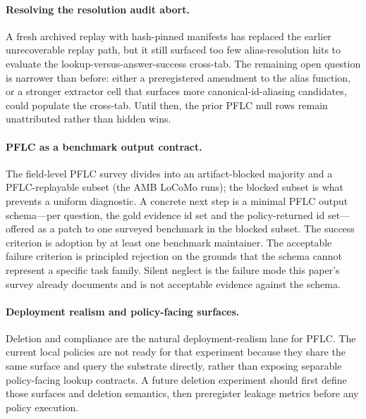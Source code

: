 \paragraph{Resolving the resolution audit abort.}
A fresh archived replay with hash-pinned manifests has replaced the earlier
unrecoverable replay path, but it still surfaced too few alias-resolution hits
to evaluate the lookup-versus-answer-success cross-tab. The remaining open
question is narrower than before: either a preregistered amendment to the alias
function, or a stronger extractor cell that surfaces more canonical-id-aliasing
candidates, could populate the cross-tab. Until then, the prior PFLC null rows
remain unattributed rather than hidden wins.

\paragraph{PFLC as a benchmark output contract.}
The field-level PFLC survey divides into an artifact-blocked majority and a
PFLC-replayable subset (the AMB LoCoMo runs); the blocked subset is what
prevents a uniform diagnostic. A concrete next step is a minimal PFLC output
schema---per question, the gold evidence id set and the policy-returned id
set---offered as a patch to one surveyed benchmark in the blocked subset. The
success criterion is adoption by at least one benchmark maintainer. The
acceptable failure criterion is principled rejection on the grounds that the
schema cannot represent a specific task family. Silent neglect is the failure
mode this paper's survey already documents and is not acceptable evidence
against the schema.

\paragraph{Deployment realism and policy-facing surfaces.}
Deletion and compliance are the natural deployment-realism lane for PFLC. The
current local policies are not ready for that experiment because they share the
same  surface and query the substrate directly, rather
than exposing separable policy-facing lookup contracts. A future deletion
experiment should first define those surfaces and deletion semantics, then
preregister leakage metrics before any policy execution.
